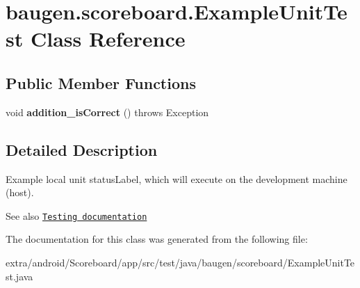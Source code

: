 \hypertarget{classbaugen_1_1scoreboard_1_1_example_unit_test}{}\section{baugen.\+scoreboard.\+Example\+Unit\+Test Class Reference}
\label{classbaugen_1_1scoreboard_1_1_example_unit_test}
\subsection*{Public Member Functions}
\begin{DoxyCompactItemize}
\item 
\hypertarget{classbaugen_1_1scoreboard_1_1_example_unit_test_a95573ef6221e86fd1560aabcd48d40a9}{}\label{classbaugen_1_1scoreboard_1_1_example_unit_test_a95573ef6221e86fd1560aabcd48d40a9} 
void {\bfseries addition\+\_\+is\+Correct} ()  throws Exception 
\end{DoxyCompactItemize}


\subsection{Detailed Description}
Example local unit status\+Label, which will execute on the development machine (host).

\begin{DoxySeeAlso}{See also}
\href{http://d.android.com/tools/testing}{\tt Testing documentation} 
\end{DoxySeeAlso}


The documentation for this class was generated from the following file\+:\begin{DoxyCompactItemize}
\item 
extra/android/\+Scoreboard/app/src/test/java/baugen/scoreboard/Example\+Unit\+Test.\+java\end{DoxyCompactItemize}
